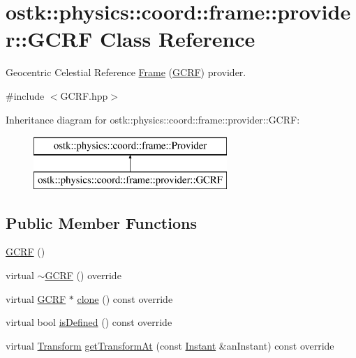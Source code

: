 \hypertarget{classostk_1_1physics_1_1coord_1_1frame_1_1provider_1_1_g_c_r_f}{}\section{ostk\+:\+:physics\+:\+:coord\+:\+:frame\+:\+:provider\+:\+:G\+C\+RF Class Reference}
\label{classostk_1_1physics_1_1coord_1_1frame_1_1provider_1_1_g_c_r_f}


Geocentric Celestial Reference \hyperlink{classostk_1_1physics_1_1coord_1_1_frame}{Frame} (\hyperlink{classostk_1_1physics_1_1coord_1_1frame_1_1provider_1_1_g_c_r_f}{G\+C\+RF}) provider.  




{\ttfamily \#include $<$G\+C\+R\+F.\+hpp$>$}

Inheritance diagram for ostk\+:\+:physics\+:\+:coord\+:\+:frame\+:\+:provider\+:\+:G\+C\+RF\+:\begin{figure}[H]
\begin{center}
\leavevmode
\includegraphics[height=2.000000cm]{classostk_1_1physics_1_1coord_1_1frame_1_1provider_1_1_g_c_r_f}
\end{center}
\end{figure}
\subsection*{Public Member Functions}
\begin{DoxyCompactItemize}
\item 
\hyperlink{classostk_1_1physics_1_1coord_1_1frame_1_1provider_1_1_g_c_r_f_a35f5f4903c6d64acc9fbd7285fe8f6bf}{G\+C\+RF} ()
\item 
virtual \hyperlink{classostk_1_1physics_1_1coord_1_1frame_1_1provider_1_1_g_c_r_f_aa02bee89fa910e3d6a76a8b68035e163}{$\sim$\+G\+C\+RF} () override
\item 
virtual \hyperlink{classostk_1_1physics_1_1coord_1_1frame_1_1provider_1_1_g_c_r_f}{G\+C\+RF} $\ast$ \hyperlink{classostk_1_1physics_1_1coord_1_1frame_1_1provider_1_1_g_c_r_f_a71f14cba2d0d20a5bbeaa3b4fb08a79a}{clone} () const override
\item 
virtual bool \hyperlink{classostk_1_1physics_1_1coord_1_1frame_1_1provider_1_1_g_c_r_f_a02160b74124b3ece74912c62aae5caaa}{is\+Defined} () const override
\item 
virtual \hyperlink{classostk_1_1physics_1_1coord_1_1_transform}{Transform} \hyperlink{classostk_1_1physics_1_1coord_1_1frame_1_1provider_1_1_g_c_r_f_a379dffe2291d4536dbdd65501fd28539}{get\+Transform\+At} (const \hyperlink{classostk_1_1physics_1_1time_1_1_instant}{Instant} \&an\+Instant) const override
\end{DoxyCompactItemize}


